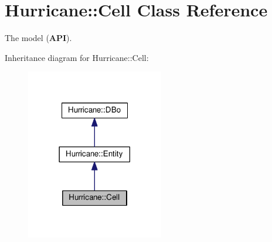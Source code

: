 \hypertarget{classHurricane_1_1Cell}{}\section{Hurricane\+:\+:Cell Class Reference}
\label{classHurricane_1_1Cell}


The model ({\bfseries A\+PI}).  




Inheritance diagram for Hurricane\+:\+:Cell\+:\nopagebreak
\begin{figure}[H]
\begin{center}
\leavevmode
\includegraphics[width=170pt]{classHurricane_1_1Cell__inherit__graph}
\end{center}
\end{figure}

